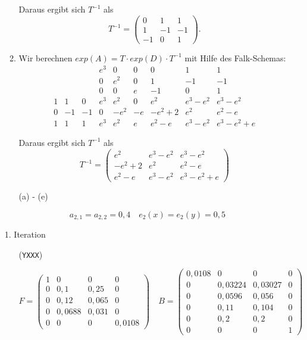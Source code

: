 \documentclass{homework}
\begin{document}
\begin{enumerate}
\begin{enumerate}
Daraus ergibt sich $T^{-1}$ als
$$T^{-1} = \begin{pmatrix}0 & 1 & 1\\1 & -1 & -1\\ -1 & 0 & 1\end{pmatrix}.$$

\item Wir berechnen $exp(A) = T \cdot exp(D) \cdot T^{-1}$ mit Hilfe des Falk-Schemas:
$$
\begin{array}{ccc|ccc|ccc}
 & & & e^3 & 0 & 0 & 0 & 1 & 1\\
 & & & 0 & e^2 & 0 & 1 & -1 & -1\\
 & & & 0 & 0 & e & -1 & 0 & 1\\\hline
1 & 1 & 0 & e^3 & e^2 & 0 & e^2 & e^3-e^2 & e^3-e^2\\
0 & -1 & -1 & 0 & -e^2 & -e & -e^2+2 & e^2 & e^2-e\\
1 & 1 & 1 & e^3 & e^2 & e & e^2-e & e^3-e^2 & e^3-e^2+e
\end{array}
$$

Daraus ergibt sich $T^{-1}$ als
$$T^{-1} = \begin{pmatrix}
e^2 & e^3-e^2 & e^3-e^2\\
-e^2+2 & e^2 & e^2-e\\
e^2-e & e^3-e^2 & e^3-e^2+e
\end{pmatrix}$$

\end{enumerate}

\begin{enumerate}
\item[(a) - (e)]
\end{enumerate}


$$a_{2,1} = a_{2,2} = 0,4 \quad e_2(x) = e_2(y) = 0,5$$

1. Iteration

\begin{itemize}
\item[(\texttt{YXXX})]

$$F = \begin{pmatrix}
1 & 0 & 0 & 0\\
0 & 0,1 & 0,25 & 0\\
0 & 0,12 & 0,065 & 0\\
0 & 0,0688 & 0,031 & 0\\
0 & 0 & 0 & 0,0108
\end{pmatrix}
\quad
B = \begin{pmatrix}
0,0108 & 0 & 0 & 0\\
0 & 0,03224 & 0,03027 & 0\\
0 & 0,0596 & 0,056 & 0\\
0 & 0,11 & 0,104 & 0\\
0 & 0,2 & 0,2 & 0\\
0 & 0 & 0 & 1
\end{pmatrix}$$


\end{itemize}
\end{enumerate}
\end{document}
